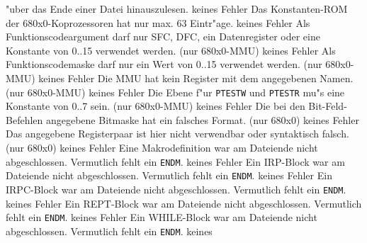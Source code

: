 \documentclass[12pt,a4paper,twoside]{report}
\newcommand{\tty}[1]{{\tt #1}}
\begin{document}
\begin{description}
{                "uber das Ende einer Datei hinauszulesen.}
               {keines}
               {Fehler}
               {Das Konstanten-ROM der 680x0-Koprozessoren hat
                nur max. 63 Eintr"age.}
               {keines}
               {Fehler}
               {Als Funktionscodeargument darf nur SFC, DFC, ein
                Datenregister oder eine Konstante von 0..15 verwendet
                werden. (nur 680x0-MMU)}
               {keines}
               {Fehler}
               {Als Funktionscodemaske darf nur ein Wert von
                0..15 verwendet werden. (nur 680x0-MMU)}
               {keines}
               {Fehler}
               {Die MMU hat kein Register mit dem angegebenen
                Namen. (nur 680x0-MMU)}
               {keines}
               {Fehler}
               {Die Ebene f"ur \tty{PTESTW} und \tty{PTESTR} mu"s eine
                Konstante von 0..7 sein. (nur 680x0-MMU)}
               {keines}
               {Fehler}
               {Die bei den Bit-Feld-Befehlen angegebene
                Bitmaske hat ein falsches Format. (nur 680x0)}
               {keines}
               {Fehler}
               {Das angegebene Registerpaar ist hier nicht
                verwendbar oder syntaktisch falsch. (nur 680x0)}
               {keines}
               {Fehler}
               {Eine Makrodefinition war am Dateiende nicht
                abgeschlossen.  Vermutlich fehlt ein \tty{ENDM}.}
               {keines}
               {Fehler}
               {Ein IRP-Block war am Dateiende nicht
                abgeschlossen.  Vermutlich fehlt ein \tty{ENDM}.}
               {keines}
               {Fehler}
               {Ein IRPC-Block war am Dateiende nicht
                abgeschlossen.  Vermutlich fehlt ein \tty{ENDM}.}
               {keines}
               {Fehler}
               {Ein REPT-Block war am Dateiende nicht
                abgeschlossen.  Vermutlich fehlt ein \tty{ENDM}.}
               {keines}
               {Fehler}
               {Ein WHILE-Block war am Dateiende nicht
                abgeschlossen.  Vermutlich fehlt ein \tty{ENDM}.}
               {keines}

\end{description}
\end{document}
